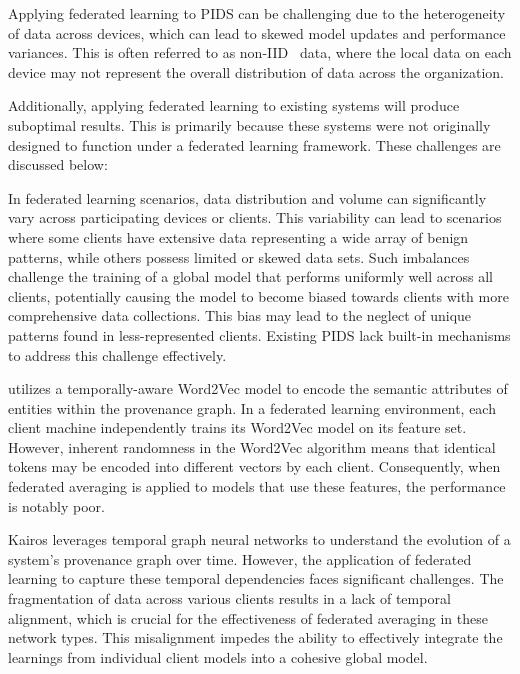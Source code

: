 Applying federated learning to PIDS can be challenging due to the heterogeneity of data across devices, which can lead to skewed model updates and performance variances. This is often referred to as non-IID~\cite{zhao2018federated} data, where the local data on each device may not represent the overall distribution of data across the organization.

Additionally, applying federated learning to existing systems will produce suboptimal results. This is primarily because these systems were not originally designed to function under a federated learning framework. These challenges are discussed below:

 In federated learning scenarios, data distribution and volume can significantly vary across participating devices or clients. This variability can lead to scenarios where some clients have extensive data representing a wide array of benign patterns, while others possess limited or skewed data sets. Such imbalances challenge the training of a global model that performs uniformly well across all clients, potentially causing the model to become biased towards clients with more comprehensive data collections. This bias may lead to the neglect of unique patterns found in less-represented clients. Existing PIDS lack built-in mechanisms to address this challenge effectively.

 \flash utilizes a temporally-aware Word2Vec model to encode the semantic attributes of entities within the provenance graph. In a federated learning environment, each client machine independently trains its Word2Vec model on its feature set. However, inherent randomness in the Word2Vec algorithm means that identical tokens may be encoded into different vectors by each client. Consequently, when federated averaging is applied to \gnn models that use these features, the performance is notably poor.

 Kairos leverages temporal graph neural networks to understand the evolution of a system's provenance graph over time. However, the application of federated learning to capture these temporal dependencies faces significant challenges. The fragmentation of data across various clients results in a lack of temporal alignment, which is crucial for the effectiveness of federated averaging in these network types. This misalignment impedes the ability to effectively integrate the learnings from individual client models into a cohesive global model.

